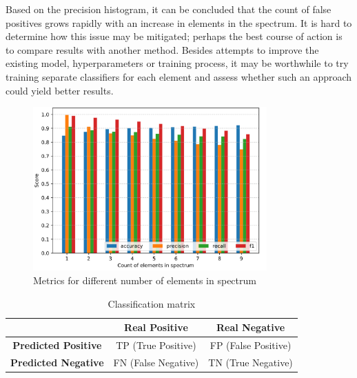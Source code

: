 Based on the precision histogram, it can be concluded that the count of false positives grows rapidly with an increase in elements in the spectrum. It is hard to determine how this issue may be mitigated; perhaps the best course of action is to compare results with another method. 
Besides attempts to improve the existing model, hyperparameters or training process, it may be worthwhile to try training separate classifiers for each element and assess whether such an approach could yield better results.

\begin{figure}[htbp!]
  \centering
  \includegraphics[width=0.8\textwidth]{img/metrics.png}
  \caption{Metrics for different number of elements in spectrum}
  \label{fig:vit-metrics}
\end{figure}

\begin{table}[htbp!]
  \centering
  \begin{tabular}{|c|c|c|}
    \hline
    & \textbf{Real Positive} & \textbf{Real Negative} \\
    \hline
    \textbf{Predicted Positive} & TP (True Positive) & FP (False Positive) \\
    \hline
    \textbf{Predicted Negative} & FN (False Negative) & TN (True Negative)  \\
    \hline
  \end{tabular}
  \caption{Classification matrix}
  \label{tab:classification_matrix}
\end{table}

